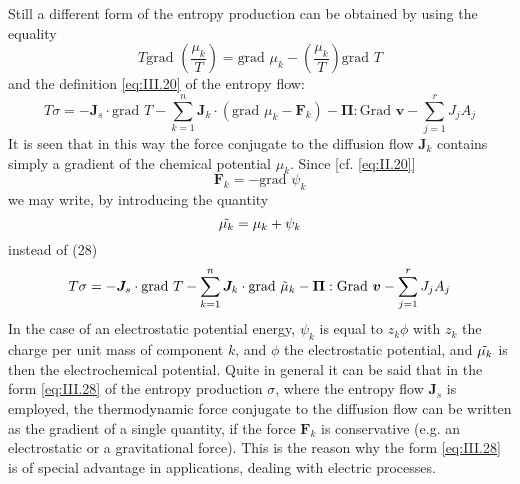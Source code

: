 Still a different form of the entropy production can be obtained by
using the equality
\begin{equation}
T \textrm{grad } \left( \frac{\mu_k}{T} \right) = \textrm{grad } \mu_k - \left( \frac{\mu_k}{T} \right) \textrm{grad } T
    \label{eq:III.27}
\end{equation}
and the definition \eqref{eq:III.20} of the entropy flow:
\begin{equation}
T \sigma = - \bm{J}_s \cdot \textrm{grad } T  - \sum_{k=1}^{n} \bm{J}_k \cdot \left( \textrm{grad } \mu_k - \bm{F}_k \right) - \bm{\Pi} : \textrm{Grad } \bm{v} - \sum_{j=1}^r J_j A_j
\label{eq:III.28}
\end{equation}
It is seen that in this way the force conjugate to the diffusion flow $\bm{J}_k$ contains simply a gradient of the chemical potential $\mu_k$. Since [cf. \eqref{eq:II.20}]
\begin{equation}
\bm{F}_k = - \textrm{grad } \psi_k
    \label{eq:III.29}
\end{equation}
we may write, by introducing the quantity
\begin{equation}
\Tilde{\mu_k} = \mu_k + \psi_k
    \label{eq:III.30}
\end{equation}
instead of (28)
\begin{equation}
T \sigma = - \bm{J}_s \cdot \textrm{grad } T  - \sum_{k=1}^{n} \bm{J}_k \cdot \textrm{grad } \Tilde{\mu}_k  - \bm{\Pi} : \textrm{Grad } \bm{v} - \sum_{j=1}^r J_j A_j
    \label{eq:III.31}
\end{equation}
In the case of an electrostatic potential energy, $\psi_k$ is equal to $z_k \phi$ with $z_k$ the charge per unit mass of component $k$, and $\phi$ the electrostatic potential, and $\Tilde{\mu_k}$ is then the electrochemical potential. Quite in general it can be said that in the form \eqref{eq:III.28} of the entropy production $\sigma$, where
the entropy flow $\bm{J}_s$ is employed, the thermodynamic force conjugate to the diffusion flow can be written as the gradient of a single quantity, if the force $\bm{F}_k$ is conservative (e.g. an electrostatic or a gravitational force). This is the reason why the form \eqref{eq:III.28} is of special advantage in applications, dealing with electric processes.

